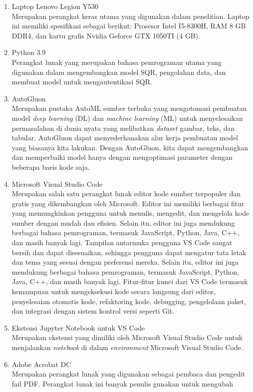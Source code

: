 \begin{enumerate}
	\item Laptop Lenovo Legion Y530\\Merupakan perangkat keras utama yang digunakan dalam penelitian. Laptop ini memiliki spesifikasi sebagai berikut: Prosesor Intel
	      I5-8300H, RAM 8 GB DDR4, dan kartu grafis Nvidia Geforce GTX 1050TI (4 GB).
	\item Python 3.9\\Perangkat lunak yang merupakan bahasa pemrograman utama yang digunakan dalam mengembangkan model SQR, pengolahan data, dan membuat model untuk
	      mengautentikasi SQR.
	\item AutoGluon\\Merupakan pustaka AutoML sumber terbuka yang mengotomasi pembuatan model \emph{deep learning} (DL) dan \emph{machine learning} (ML) untuk
	      menyelesaikan permasalahan di dunia nyata yang melibatkan \emph{dataset} gambar, teks, dan tabular. AutoGluon dapat menyederhanakan alur kerja pembuatan model
	      yang biasanya kita lakukan. Dengan AutoGluon, kita dapat mengembangkan dan memperbaiki model hanya dengan mengoptimasi parameter dengan beberapa baris kode
	      saja.
	\item Microsoft Visual Studio Code\\Merupakan salah satu perangkat lunak editor kode sumber terpopuler dan gratis yang dikembangkan oleh Microsoft. Editor ini
	      memiliki berbagai fitur yang memungkinkan pengguna untuk menulis, mengedit, dan mengelola kode sumber dengan mudah dan efisien. Selain itu, editor ini juga
	      mendukung berbagai bahasa pemrograman, termasuk JavaScript, Python, Java, C++, dan masih banyak lagi. Tampilan antarmuka pengguna VS Code sangat bersih dan
	      dapat disesuaikan, sehingga pengguna dapat mengatur tata letak dan tema yang sesuai dengan preferensi mereka. Selain itu, editor ini juga mendukung berbagai
	      bahasa pemrograman, termasuk JavaScript, Python, Java, C++, dan masih banyak lagi. Fitur-fitur kunci dari VS Code termasuk kemampuan untuk mengeksekusi kode
	      secara langsung dari editor, penyelesaian otomatis kode, refaktoring kode, debugging, pengelolaan paket, dan integrasi dengan sistem kontrol versi seperti Git.
	\item Ekstensi Jupyter Notebook untuk VS Code\\Merupakan ekstensi yang dimiliki oleh Microsoft Visual Studio Code untuk menjalankan \emph{notebook} di dalam
	      \emph{environment} Microsoft Visual Studio Code.
	\item Adobe Acrobat DC\\Merupakan perangkat lunak yang digunakan sebagai pembaca dan pengedit fail PDF. Perangkat lunak ini banyak penulis gunakan untuk mengubah

\end{enumerate}
